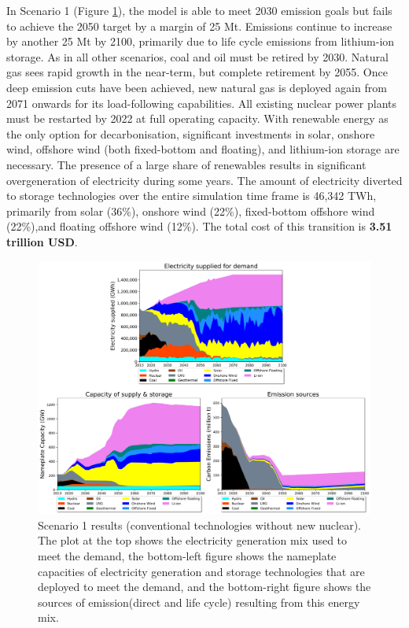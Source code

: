 In Scenario 1 (Figure \ref{scen1}), the model is able to meet 2030 emission goals but fails to achieve the 2050 target by a margin of 25 Mt. Emissions continue to increase by another 25 Mt by 2100, primarily due to life cycle emissions from lithium-ion storage. As in all other scenarios, coal and oil must be retired by 2030. Natural gas sees rapid growth in the near-term, but complete retirement by 2055. Once deep emission cuts have been achieved, new natural gas is deployed again from 2071 onwards for its load-following capabilities. All existing nuclear power plants must be restarted by 2022 at full operating capacity. With renewable energy as the only option for decarbonisation, significant investments in solar, onshore wind, offshore wind (both fixed-bottom and floating), and lithium-ion storage are necessary. The presence of a large share of renewables results in significant overgeneration of electricity during some years. The amount of electricity diverted to storage technologies over the entire simulation time frame is 46,342 TWh, primarily from solar (36\%), onshore wind (22\%), fixed-bottom offshore wind (22\%),and floating offshore wind (12\%). The total cost of this transition is \textbf{3.51 trillion USD}.

\begin{figure}[H] 
\centering
\includegraphics[scale=0.5]{figures/conv_nonuc}
\caption{Scenario 1 results (conventional technologies without new nuclear). The plot at the top shows the electricity generation mix used to meet the demand, the bottom-left figure shows the nameplate capacities of electricity generation and storage technologies that are deployed to meet the demand, and the bottom-right figure shows the sources of emission(direct and life cycle) resulting from this energy mix.}
\label{scen1}
\end{figure}

